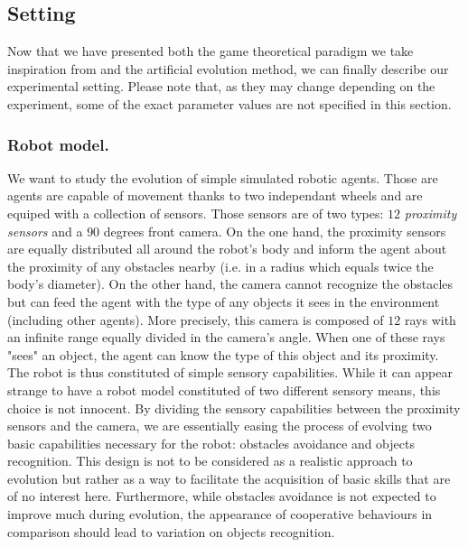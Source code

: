 


  \subsection{Setting} %

    Now that we have presented both the game theoretical paradigm we take inspiration from and the artificial evolution method, we can finally describe our experimental setting. Please note that, as they may change depending on the experiment, some of the exact parameter values are not specified in this section.

    \subsubsection{Robot model.} We want to study the evolution of simple simulated robotic agents. Those are agents are capable of movement thanks to two independant wheels and are equiped with a collection of sensors. Those sensors are of two types: $12$ \emph{proximity sensors} and a $90$ degrees front {camera}. On the one hand, the proximity sensors are equally distributed all around the robot's body and inform the agent about the proximity of any obstacles nearby (i.e. in a radius which equals twice the body's diameter). On the other hand, the camera cannot recognize the obstacles but can feed the agent with the type of any objects it sees in the environment (including other agents). More precisely, this camera is composed of $12$ rays with an infinite range equally divided in the camera's angle. When one of these rays "sees" an object, the agent can know the type of this object and its proximity. The robot is thus constituted of simple sensory capabilities. While it can appear strange to have a robot model constituted of two different sensory means, this choice is not innocent. By dividing the sensory capabilities between the proximity sensors and the camera, we are essentially easing the process of evolving two basic capabilities necessary for the robot: obstacles avoidance and objects recognition. This design is not to be considered as a realistic approach to evolution but rather as a way to facilitate the acquisition of basic skills that are of no interest here. Furthermore, while obstacles avoidance is not expected to improve much during evolution, the appearance of cooperative behaviours in comparison should lead to variation on objects recognition.

